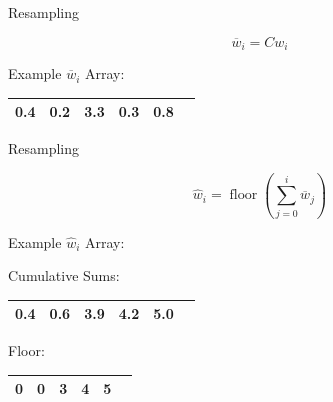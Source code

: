 \documentclass{beamer}
\begin{document}

\begin{frame}{Resampling}

\begin{equation}\label{resample2}
\overline{w}_{i}=C w_{i}
\end{equation}

\vspace{0.5cm}

\begin{center}
Example \(\overline{w}_{i}\) Array:
\end{center}

\renewcommand{\tabcolsep}{0.5cm}
\begin{center}
\begin{tabular}{ | c | c | c | c | c | c | }
  \hline
   0.4 & 0.2 & 3.3 & 0.3 & 0.8 \\
  \hline
\end{tabular}
\end{center}

\end{frame}



\begin{frame}{Resampling}

\begin{equation}\label{resample3}
\hat{w}_{i}=\operatorname{floor}(\sum_{j=0}^{i} \overline{w}_{j})
\end{equation}

\vspace{0.5cm}

\begin{center}
Example \(\hat{w}_{i}\) Array:
\end{center}

\renewcommand{\tabcolsep}{0.5cm}

\begin{center}
Cumulative Sums:
\end{center}
\begin{center}
\begin{tabular}{ | c | c | c | c | c | c | }
  \hline
   0.4 & 0.6 & 3.9 & 4.2 & 5.0 \\
  \hline
\end{tabular}
\end{center}

\renewcommand{\tabcolsep}{0.65cm}

\begin{center}
Floor:
\end{center}
\begin{center}
\begin{tabular}{ | c | c | c | c | c | c | }
  \hline
   0 & 0 & 3 & 4 & 5 \\
  \hline
\end{tabular}
\end{center}

\end{frame}
\end{document}
